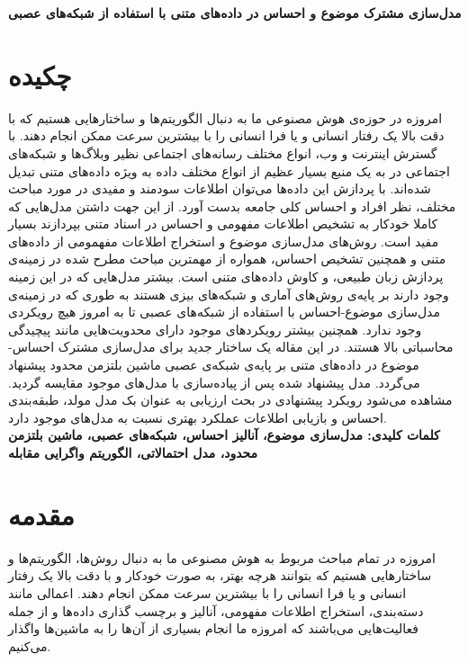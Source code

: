 \documentclass[12pt,a4paper]{article}
\begin{document}
\begin{center}
	{\Large \textbf{مدل‌سازی مشترک موضوع و احساس در داده‌های متنی با استفاده از شبکه‌های عصبی}}\\
\end{center}

	
\section*{چکیده}
\begin{small}
	\baselineskip=0.7cm
	امروزه در حوزه‌ی هوش مصنوعی ما به دنبال الگوریتم‌ها و ساختارهایی هستیم که با دقت بالا یک  رفتار انسانی‌ و یا فرا انسانی‌ را با بیشترین سرعت ممکن انجام دهند. با گسترش اینترنت و وب، انواع مختلف رسانه‌های اجتماعی نظیر وبلاگ‌ها و شبکه‌های اجتماعی در به یک منبع بسیار عظیم از انواع مختلف داده به ویژه داده‌‌های  متنی تبدیل شده‌اند. با پردازش این داده‌ها می‌‌توان اطلاعات سودمند و مفیدی در مورد مباحث مختلف، نظر افراد و احساس کلی‌ جامعه بدست آورد. از این جهت داشتن مدل‌هایی که کاملا خودکار به تشخیص اطلاعات مفهومی‌ و احساس در اسناد متنی بپردازند بسیار مفید است. روش‌های مدل‌سازی موضوع و استخراج اطلاعات مفهمومی از داده‌های متنی و همچنین تشخیص احساس، همواره از مهمترین مباحث مطرح شده در زمینه‌ی پردازش زبان طبیعی، و کاوش داده‌های متنی است. بیشتر مدل‌هایی که در این زمینه وجود دارند بر پایه‌ی روش‌های آماری و شبکه‌های بیزی هستند به طوری که در زمینه‌ی مدل‌سازی موضوع-احساس با استفاده از شبکه‌های عصبی تا به امروز هیچ رویکردی وجود ندارد. همچنین بیشتر رویکردهای موجود دارای محدویت‌هایی مانند پیچیدگی محاسباتی بالا هستند. در این مقاله یک ساختار جدید برای مدل‌سازی مشترک احساس-موضوع در داده‌های متنی بر پایه‌ی شبکه‌‌ی عصبی ماشین بلتزمن محدود پیشنهاد می‌‌گردد. مدل پیشنهاد شده پس از پیاده‌سازی با مدل‌های موجود مقایسه گردید. مشاهده می‌شود رویکرد پیشنهادی در بحث ارزیابی به عنوان بک مدل مولد، طبقه‌بندی احساس و بازیابی اطلاعات عملکرد بهتری نسبت به مدل‌های موجود دارد.\\
	\noindent\textbf{کلمات کلیدی: مدل‌سازی موضوع، آنالیز احساس، شبکه‌ها‌ی عصبی، ماشین بلتزمن محدود، مدل احتمالاتی، الگوریتم واگرایی مقابله}
\end{small} 


\section{مقدمه}


\label{sec1}

امروزه در تمام مباحث مربوط به هوش مصنوعی ما به دنبال روش‌ها، الگوریتم‌ها و ساختارهایی هستیم که بتوانند هرچه بهتر، 
به صورت خودکار و با دقت بالا یک  رفتار انسانی‌ و یا فرا انسانی‌ را با بیشترین سرعت ممکن انجام دهند. اعمالی مانند دسته‌بندی، استخراج اطلاعات مفهومی، آنالیز و برچسب گذاری داده‌ها و از جمله فعالیت‌هایی‌ می‌‌باشند که امروزه ما انجام بسیاری از آن‌ها را به ماشین‌ها واگذار می‌‌کنیم. 
\end{document}

